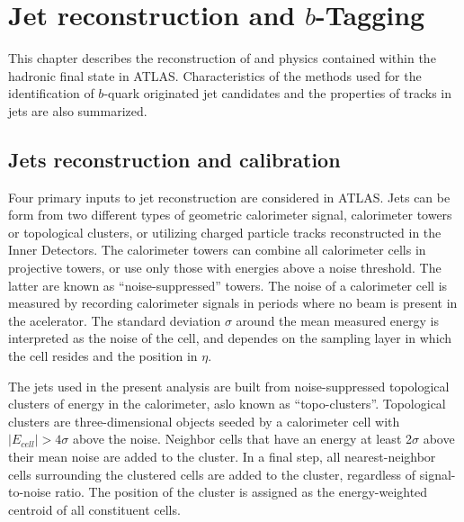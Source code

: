 %
%

\chapter{Jet reconstruction and $b$-Tagging }\label{ch:reco}


This chapter describes the reconstruction of and physics contained within the hadronic final state in ATLAS.
Characteristics of the methods used for the identification of $b$-quark originated jet candidates and the properties of tracks in jets are also summarized. 

\section{Jets reconstruction and calibration}\label{sec:ObjSelection}

Four primary inputs to jet reconstruction are considered in ATLAS. Jets can be form from two different types of geometric calorimeter signal, calorimeter towers or topological clusters, or utilizing charged particle tracks reconstructed in the Inner Detectors. The calorimeter towers can combine all calorimeter cells in projective towers, or use only those with energies above a noise threshold. The latter are known as ``noise-suppressed'' towers.  The noise of a calorimeter cell is measured by recording calorimeter signals in periods where no beam is present in the acelerator.  The standard deviation $\sigma$ around the mean measured energy is interpreted as the noise of the cell, and dependes on the sampling layer in which the cell resides and the position in $\eta$.

The jets used in the present analysis are built from noise-suppressed topological clusters of energy in the calorimeter, aslo known as ``topo-clusters''. Topological clusters are three-dimensional objects seeded by a calorimeter cell with $|E_{cell}| > 4 \sigma$ above the noise. Neighbor cells that have an energy at least 2$\sigma$ above their mean noise are added to the cluster. In a final step, all nearest-neighbor cells surrounding the clustered cells are added to the cluster, regardless of signal-to-noise ratio. The position of the cluster is assigned as the energy-weighted centroid of all constituent cells.  

